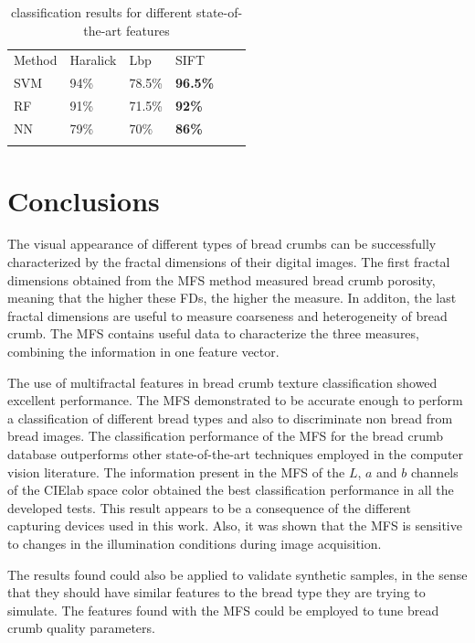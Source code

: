 \begin{table}
\caption{classification results for different state-of-the-art features}
\label{tab:other}       %
\begin{tabular}{llllll}
\hline\noalign{\smallskip}
Method & Haralick & Lbp & SIFT\\ %
\noalign{\smallskip}\hline\noalign{\smallskip}
SVM & 94\% & 78.5\% & \textbf{96.5\%} \\ %
RF  & 91\% & 71.5\% & \textbf{92\%} \\ %
NN & 79\% & 70\% & \textbf{86\%} \\ %
\noalign{\smallskip}\hline
\end{tabular}
\end{table}




\section{Conclusions}
\label{sec:11}
The visual appearance of different types of bread crumbs can be successfully characterized by the fractal dimensions of their digital images. The first fractal dimensions obtained from the MFS method measured bread crumb porosity, meaning that the higher these FDs, the higher the measure. In additon, the last fractal dimensions are useful to measure coarseness and heterogeneity of bread crumb. The MFS contains useful data to characterize the three measures, combining the information in one feature vector.


The use of multifractal features in bread crumb texture classification showed excellent performance. The MFS demonstrated to be accurate enough to perform a classification of different bread types and also to discriminate non bread from bread images. The classification performance of the MFS for the bread crumb database outperforms other state-of-the-art techniques employed in the computer vision literature. The information present in the MFS of the $L$, $a$ and $b$ channels of the CIElab space color obtained the best classification performance in all the developed tests. This result appears to be a consequence of the different capturing devices used in this work. Also, it was shown that the MFS is sensitive to changes in the illumination conditions during image acquisition.

The results found could also be applied to validate synthetic samples, in the sense that they should have similar features to the bread type they are trying to simulate. The features found with the MFS could be employed to tune bread crumb quality parameters.

